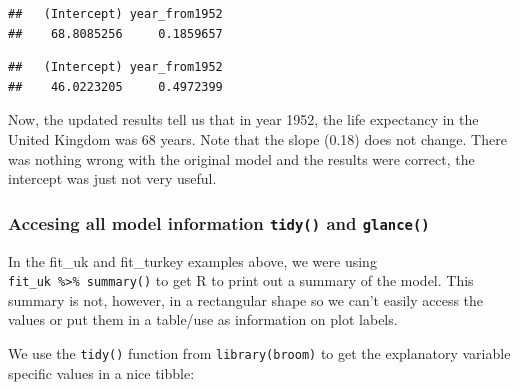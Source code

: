 \documentclass[12pt,]{krantz}
\makeatletter
\newenvironment{Shaded}{\begin{snugshade}}{\end{snugshade}}
\newcommand{\KeywordTok}[1]{\textcolor[rgb]{0.13,0.29,0.53}{\textbf{#1}}}
\newcommand{\NormalTok}[1]{#1}
\newcommand{\OperatorTok}[1]{\textcolor[rgb]{0.81,0.36,0.00}{\textbf{#1}}}
\newcommand{\StringTok}[1]{\textcolor[rgb]{0.31,0.60,0.02}{#1}}
\newenvironment{kframe}{%
\medskip{}
\setlength{\fboxsep}{.8em}
 \def\at@end@of@kframe{}%
 \ifinner\ifhmode%
  \def\at@end@of@kframe{\end{minipage}}%
  \begin{minipage}{\columnwidth}%
 \fi\fi%
 \def\FrameCommand##1{\hskip\@totalleftmargin \hskip-\fboxsep
 \colorbox{shadecolor}{##1}\hskip-\fboxsep
     \hskip-\linewidth \hskip-\@totalleftmargin \hskip\columnwidth}%
 \MakeFramed {\advance\hsize-\width
   \@totalleftmargin\z@ \linewidth\hsize
   \@setminipage}}%
 {\par\unskip\endMakeFramed%
 \at@end@of@kframe}
\renewenvironment{Shaded}{\begin{kframe}}{\end{kframe}}
\theoremstyle{definition}
\theoremstyle{definition}
\theoremstyle{definition}
\theoremstyle{remark}
\makeatother
\begin{document}
\begin{Shaded}
\end{Shaded}

\begin{verbatim}
##   (Intercept) year_from1952 
##    68.8085256     0.1859657
\end{verbatim}

\begin{Shaded}
\end{Shaded}

\begin{verbatim}
##   (Intercept) year_from1952 
##    46.0223205     0.4972399
\end{verbatim}

Now, the updated results tell us that in year 1952, the life expectancy
in the United Kingdom was 68 years. Note that the slope (0.18) does not
change. There was nothing wrong with the original model and the results
were correct, the intercept was just not very useful.

\hypertarget{accesing-all-model-information-tidy-and-glance}{%
\subsubsection{\texorpdfstring{Accesing all model information
\texttt{tidy()} and
\texttt{glance()}}{Accesing all model information tidy() and glance()}}\label{accesing-all-model-information-tidy-and-glance}}

In the fit\_uk and fit\_turkey examples above, we were using
\texttt{fit\_uk\ \%\textgreater{}\%\ summary()} to get R to print out a
summary of the model. This summary is not, however, in a rectangular
shape so we can't easily access the values or put them in a table/use as
information on plot labels.

We use the \texttt{tidy()} function from \texttt{library(broom)} to get
the explanatory variable specific values in a nice tibble:

\begin{Shaded}
\end{Shaded}
\end{document}
